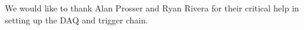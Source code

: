 \documentclass[preprint,1p]{elsarticle}
\begin{document}
We would like to thank Alan Prosser and Ryan Rivera for their critical help in
setting up the DAQ and trigger chain. 





{}
 




\end{document}
